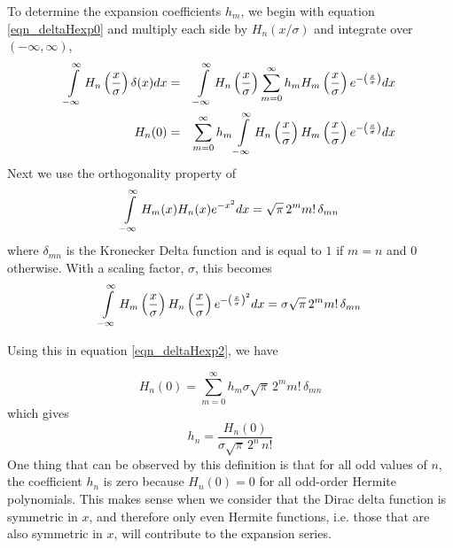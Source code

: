 \documentclass[preprint]{revtex4}
\newcommand{\rtpi}{\ensuremath{\sqrt{\pi}}}
\newcommand{\intl}{\int\displaylimits}
\begin{document}
To determine the expansion coefficients $h_m$, we begin with equation \ref{eqn_deltaHexp0}
and multiply each side by $H_n(x/\sigma)$ and integrate over $(-\infty,\infty)$, 
\begin{eqnarray}
\label{eqn_deltaHexp1}
\intl_{-\infty}^{\infty}H_n\left(\frac{x}{\sigma}\right)\delta(x)dx & = & 
 \intl_{-\infty}^{\infty}H_n\left(\frac{x}{\sigma}\right)\sum_{m=0}^\infty h_m H_m\left(\frac{x}{\sigma}\right) e^{-\left(\frac{x}{\sigma}\right)} dx \\*
H_n(0) & = & 
\sum_{m=0}^\infty h_m \intl_{-\infty}^{\infty}H_n\left(\frac{x}{\sigma}\right)
H_m\left(\frac{x}{\sigma}\right) e^{-\left(\frac{x}{\sigma}\right)} dx 
\label{eqn_deltaHexp2}
\end{eqnarray}
Next we use the orthogonality property\cite{HermiteWiki,HermitePolyMW} of 
\begin{equation}
\label{eqn_Hortho}
\intl_{-\infty}^{\infty}H_m(x)H_n(x)e^{-x^2}dx = \rtpi\, 2^m m!\, \delta_{mn}
\end{equation}
where $\delta_{mn}$ is the Kronecker Delta function and is equal to $1$ if $m=n$ and $0$ otherwise. 
With a scaling factor, $\sigma$, this becomes
\begin{equation}
\label{eqn_Hortho1}
\intl_{-\infty}^{\infty} H_m\left(\frac{x}{\sigma}\right) H_n\left(\frac{x}{\sigma}\right) 
e^{-\left(\frac{x}{\sigma}\right)^2}dx = 
\sigma \rtpi\, 2^m m!\, \delta_{mn}
\end{equation}

Using this in equation \ref{eqn_deltaHexp2}, we have

\begin{equation*}
H_n(0)  =  \sum_{m=0}^\infty h_m \sigma \rtpi\, 2^m m!\, \delta_{mn} \nonumber
\end{equation*}
which gives
\begin{equation}
h_n = \frac{H_n(0)}{\sigma \rtpi \, 2^n \, n!}
\label{eqn_deltaHexp_hn}
\end{equation}
One thing that can be observed by this definition is that for all odd values of $n$, the
coefficient $h_n$ is zero because $H_n(0)=0$ for all odd-order Hermite polynomials. 
This makes sense when we consider that the Dirac delta function is symmetric in $x$, and
therefore only even Hermite functions, i.e. those that are also symmetric in $x$, will
contribute to the expansion series. 
\end{document}

